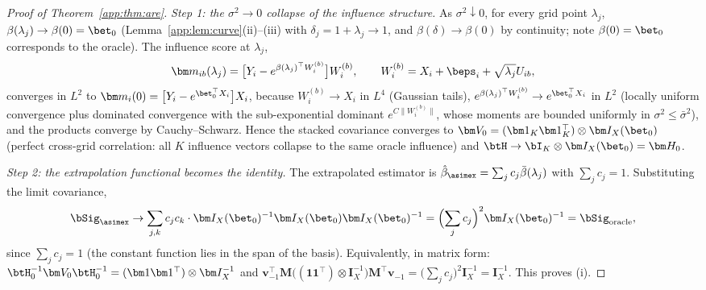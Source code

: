 \begin{proof}[Proof of Theorem~\ref{app:thm:are}]
\emph{Step 1: the $\sigma^2\to0$ collapse of the influence structure.}
As $\sigma^2\downarrow0$, for every grid point $\lambda_j$,
$\beta(\lambda_j)\to\beta(0)=\bet_0$
(Lemma~\ref{app:lem:curve}(ii)--(iii) with $\delta_j=1+\lambda_j\to1$, and
$\beta(\delta)\to\beta(0)$ by continuity; note $\beta(0)=\bet_0$
corresponds to the oracle). The influence score at $\lambda_j$,
\[
  \bm m_{ib}(\lambda_j)
  =\bigl[Y_i-e^{\beta(\lambda_j)^\top W_i^{(b)}}\bigr]
   W_i^{(b)},\qquad
  W_i^{(b)}=X_i+\beps_i+\sqrt{\lambda_j}U_{ib},
\]
converges in $L^2$ to $\bm m_i(0)=
\bigl[Y_i-e^{\bet_0^\top X_i}\bigr]X_i$, because
$W_i^{(b)}\to X_i$ in $L^4$ (Gaussian tails),
$e^{\beta(\lambda_j)^\top W_i^{(b)}}\to e^{\bet_0^\top X_i}$ in $L^2$
(locally uniform convergence plus dominated convergence with the
sub-exponential dominant $e^{C\|W_i^{(b)}\|}$, whose moments are bounded
uniformly in $\sigma^2\le\bar\sigma^2$), and the products converge by
Cauchy--Schwarz. Hence the stacked covariance converges to
$\bm V_0=(\bm 1_K\bm 1_K^\top)\otimes\bm I_X(\bet_0)$ (perfect
cross-grid correlation: all $K$ influence vectors collapse to the same
oracle influence) and $\btH\to\bI_K\otimes\bm I_X(\bet_0)=\bm H_0$.

\emph{Step 2: the extrapolation functional becomes the identity.} The
extrapolated estimator is
$\hat\beta_{\asimex}=\sum_j c_j\bar\beta(\lambda_j)$ with
$\sum_j c_j=1$. Substituting the limit covariance,
\[
  \bSig_{\asimex}\to
  \sum_{j,k}c_jc_k\cdot\bm I_X(\bet_0)^{-1}
  \bm I_X(\bet_0)\bm I_X(\bet_0)^{-1}
  =\Bigl(\sum_jc_j\Bigr)^2\bm I_X(\bet_0)^{-1}
  =\bSig_{\mathrm{oracle}},
\]
since $\sum_jc_j=1$ (the constant function lies in the span of the
basis). Equivalently, in matrix form:
$\btH_0^{-1}\bm V_0\btH_0^{-1}
=(\bm 1\bm 1^\top)\otimes\bm I_X^{-1}$ and
$\bm v_{-1}^\top\bm M\bigl((\bm 1\bm 1^\top)\otimes\bm I_X^{-1}\bigr)
\bm M^\top\bm v_{-1}=\bigl(\sum_jc_j\bigr)^2\bm I_X^{-1}
=\bm I_X^{-1}$. This proves (i).


\end{proof}
